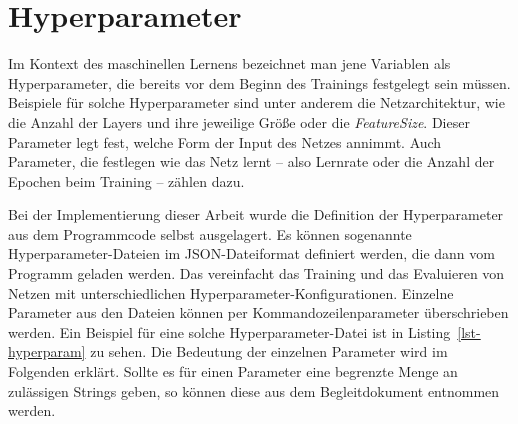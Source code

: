   

\section{Hyperparameter}
\label{sec:hypp}


Im Kontext des maschinellen Lernens bezeichnet man jene Variablen als Hyperparameter, 
die bereits vor dem Beginn des Trainings festgelegt sein müssen.
Beispiele für solche Hyperparameter sind unter anderem die Netzarchitektur, wie die Anzahl der Layers und ihre jeweilige Größe 
oder die \textit{FeatureSize}.
Dieser Parameter legt fest, welche Form der Input des Netzes annimmt.
Auch Parameter, die festlegen wie das Netz lernt -- also Lernrate oder die Anzahl der Epochen beim Training -- zählen dazu.

Bei der Implementierung dieser Arbeit wurde die Definition der Hyperparameter aus dem Programmcode selbst ausgelagert.
Es können sogenannte Hyperparameter-Dateien im JSON-Dateiformat definiert werden, die dann vom Programm geladen werden.
Das vereinfacht das Training und das Evaluieren von Netzen mit unterschiedlichen Hyperparameter-Konfigurationen.
Einzelne Parameter aus den Dateien können per Kommandozeilenparameter überschrieben werden.
Ein Beispiel für eine solche Hyperparameter-Datei ist in Listing~\ref{lst-hyperparam} zu sehen.
Die Bedeutung der einzelnen Parameter wird im Folgenden erklärt. 
Sollte es für einen Parameter eine begrenzte Menge an zulässigen Strings geben, 
so können diese aus dem Begleitdokument entnommen werden.


\newpage


